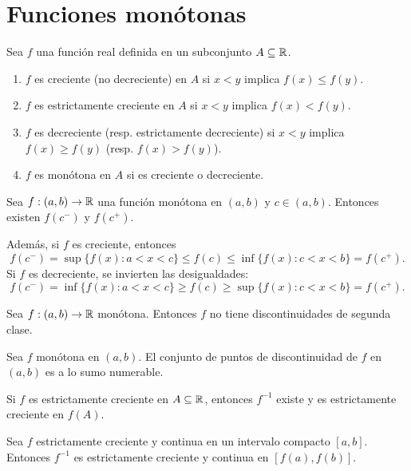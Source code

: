 \section{Funciones monótonas}

\begin{definicion}
Sea $f$ una función real definida en un subconjunto $A\subseteq\mathbb{R}$.
\begin{enumerate}
    \item $f$ es creciente (no decreciente) en $A$ si $x<y$ implica $f(x)\le f(y)$.
    \item $f$ es estrictamente creciente en $A$ si $x<y$ implica $f(x)<f(y)$.
    \item $f$ es decreciente (resp. estrictamente decreciente) si $x<y$ implica $f(x)\ge f(y)$ (resp. $f(x)>f(y)$).
    \item $f$ es monótona en $A$ si es creciente o decreciente.
\end{enumerate}
\end{definicion}

\begin{teorema}
Sea $f:(a,b)\to\mathbb{R}$ una función monótona en $(a,b)$ y $c\in(a,b)$.
Entonces existen $f(c^-)$ y $f(c^+)$.

Además, si $f$ es creciente, entonces
\[
f(c^-)=\sup\{f(x):a<x<c\}\le f(c)\le \inf\{f(x):c<x<b\}=f(c^+).
\]
Si $f$ es decreciente, se invierten las desigualdades:
\[
f(c^-)=\inf\{f(x):a<x<c\}\ge f(c)\ge \sup\{f(x):c<x<b\}=f(c^+).
\]
\end{teorema}

\begin{corolario}
Sea $f:(a,b)\to\mathbb{R}$ monótona. Entonces $f$ no tiene discontinuidades de segunda clase.
\end{corolario}

\begin{teorema}
Sea $f$ monótona en $(a,b)$. El conjunto de puntos de discontinuidad de $f$ en $(a,b)$ es a lo sumo numerable.
\end{teorema}

\begin{teorema}
Si $f$ es estrictamente creciente en $A\subseteq\mathbb{R}$, entonces $f^{-1}$ existe y es estrictamente creciente en $f(A)$.
\end{teorema}

\begin{teorema}
Sea $f$ estrictamente creciente y continua en un intervalo compacto $[a,b]$.
Entonces $f^{-1}$ es estrictamente creciente y continua en $[f(a),f(b)]$.
\end{teorema}
